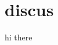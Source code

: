 \documentclass[fleqn,12pt]{SelfArx} %
\begin{document}
\section{discus}
hi there

% 
% 

\end{document}
